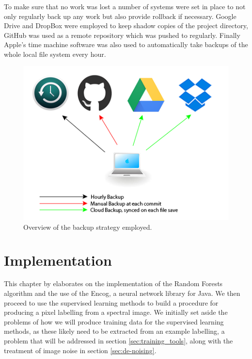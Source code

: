 \documentclass[12pt,twoside,notitlepage]{report}
\begin{document}
            To make sure that no work was lost a number of systems were set in place to not only regularly back up 
            any work but also provide rollback if necessary. Google Drive and DropBox were employed to keep shadow 
            copies of the project directory, GitHub was used as a remote repository which was pushed to regularly. 
            Finally Apple's time machine software was also used to automatically take backups of the whole local 
            file system every hour.

            \begin{figure}
                \centering
                \includegraphics[scale=0.75]{backup_plan}
                \caption[Overview of the backup strategy employed.]{Overview of the backup strategy employed\footnotemark.}
            \end{figure}






\cleardoublepage
\chapter{Implementation}
    This chapter by elaborates on the implementation of the Random Forests algorithm and the use of the Encog, a 
    neural network library for Java. We then proceed to use the supervised learning methods to build a procedure for 
    producing a pixel labelling from a spectral image. We initially set aside the problems of how we will produce 
    training data for the supervised learning methods, as these likely need to be extracted from an example labelling, 
    a problem that will be addressed in section \ref{sec:training_tools}, along with the treatment of image noise in 
    section \ref{sec:de-noising}.
\end{document}
